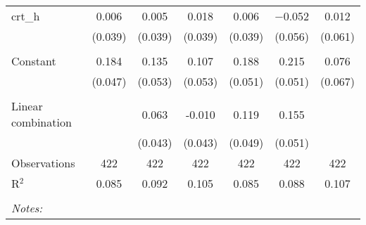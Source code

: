 \begin{table}[!htbp]
\begin{tabular}{@{\extracolsep{5pt}}lcccccc}
 crt\_h & 0.006 & 0.005 & 0.018 & 0.006 & $-$0.052 & 0.012 \\ 
  & (0.039) & (0.039) & (0.039) & (0.039) & (0.056) & (0.061) \\ 
  & & & & & & \\ 
 Constant & 0.184 & 0.135 & 0.107 & 0.188 & 0.215 & 0.076 \\ 
  & (0.047) & (0.053) & (0.053) & (0.051) & (0.051) & (0.067) \\ 
  & & & & & & \\ 
Linear combination &   & 0.063 & -0.010 & 0.119 & 0.155 &  \\ 
 &  & (0.043) & (0.043) & (0.049) & (0.051) &  \\ 
Observations & 422 & 422 & 422 & 422 & 422 & 422 \\ 
R$^{2}$ & 0.085 & 0.092 & 0.105 & 0.085 & 0.088 & 0.107 \\ 
\hline \\[-1.8ex] 
\textit{Notes:} & \multicolumn{6}{l}{} \\ 
\end{tabular} 
\end{table} 

